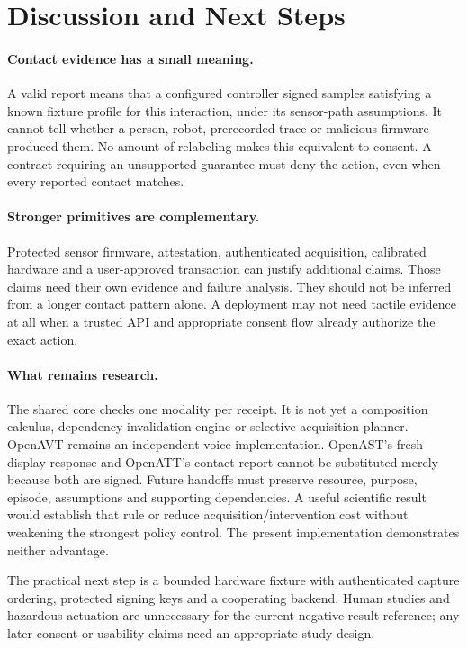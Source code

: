 \section{Discussion and Next Steps}
\paragraph{Contact evidence has a small meaning.}
A valid report means that a configured controller signed samples satisfying a
known fixture profile for this interaction, under its sensor-path assumptions.
It cannot tell whether a person, robot, prerecorded trace or malicious firmware
produced them. No amount of relabeling makes this equivalent to consent. A
contract requiring an unsupported guarantee must deny the action, even when
every reported contact matches.

\paragraph{Stronger primitives are complementary.}
Protected sensor firmware, attestation, authenticated acquisition, calibrated
hardware and a user-approved transaction can justify additional claims. Those
claims need their own evidence and failure analysis. They should not be inferred
from a longer contact pattern alone. A deployment may not need tactile evidence
at all when a trusted API and appropriate consent flow already authorize the
exact action.

\paragraph{What remains research.}
The shared core checks one modality per receipt. It is not yet a composition
calculus, dependency invalidation engine or selective acquisition planner. OpenAVT
remains an independent voice implementation. OpenAST's fresh display response and
OpenATT's contact report cannot be substituted merely because both are signed.
Future handoffs must preserve resource, purpose, episode, assumptions and
supporting dependencies. A useful scientific result would establish that rule
or reduce acquisition/intervention cost without weakening the strongest policy
control. The present implementation demonstrates neither advantage.

The practical next step is a bounded hardware fixture with authenticated capture
ordering, protected signing keys and a cooperating backend. Human studies and
hazardous actuation are unnecessary for the current negative-result reference;
any later consent or usability claims need an appropriate study design.

